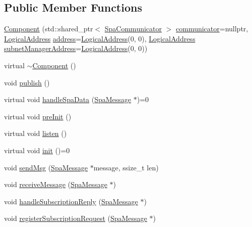 \subsection*{Public Member Functions}
\begin{DoxyCompactItemize}
\item 
\hyperlink{classComponent_a83f43d60a90000cfd63aca351ba648c4}{Component} (std\+::shared\+\_\+ptr$<$ \hyperlink{classSpaCommunicator}{Spa\+Communicator} $>$ \hyperlink{classComponent_ab124decba1547f96b7df055e3b7e902e}{communicator}=nullptr, \hyperlink{structLogicalAddress}{Logical\+Address} \hyperlink{classComponent_aa60ef4220c2630dde612e2f0164b3676}{address}=\hyperlink{structLogicalAddress}{Logical\+Address}(0, 0), \hyperlink{structLogicalAddress}{Logical\+Address} \hyperlink{classComponent_a8147bae546da489c3ffa5a1a634739a0}{subnet\+Manager\+Address}=\hyperlink{structLogicalAddress}{Logical\+Address}(0, 0))
\item 
virtual \hyperlink{classComponent_a2e9aa4348314d981f05f67397ad2f872}{$\sim$\+Component} ()
\item 
void \hyperlink{classComponent_a22b96395923537ce1a56692fdd971749}{publish} ()
\item 
virtual void \hyperlink{classComponent_a0f71f7a7ff6c0e7cd28692b6890a0058}{handle\+Spa\+Data} (\hyperlink{structSpaMessage}{Spa\+Message} $\ast$)=0
\item 
virtual void \hyperlink{classComponent_a9e6d270061f52a3b42e9d2b0fd8f65c2}{pre\+Init} ()
\item 
virtual void \hyperlink{classComponent_a2bbe062eb418a541fd0cfbcfdf3f55b0}{listen} ()
\item 
virtual void \hyperlink{classComponent_a56baf8afdea3366554b3c7b13fd6e3f7}{init} ()=0
\item 
void \hyperlink{classComponent_a4fe6afd53663b5c1d3b60977024bc86a}{send\+Msg} (\hyperlink{structSpaMessage}{Spa\+Message} $\ast$message, ssize\+\_\+t len)
\item 
void \hyperlink{classComponent_a3142ee952db05b1352f539d446f63934}{receive\+Message} (\hyperlink{structSpaMessage}{Spa\+Message} $\ast$)
\item 
void \hyperlink{classComponent_af387d0bc27df38fc6c797d6d3329697a}{handle\+Subscription\+Reply} (\hyperlink{structSpaMessage}{Spa\+Message} $\ast$)
\item 
void \hyperlink{classComponent_aaa5c27b493d39887885adb3dd21e2224}{register\+Subscription\+Request} (\hyperlink{structSpaMessage}{Spa\+Message} $\ast$)
\item 

\end{DoxyCompactItemize}
